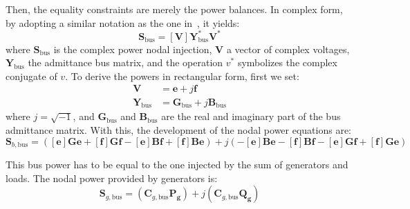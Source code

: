 \documentclass{article}
\begin{document}
Then, the equality constraints are merely the power balances. In complex form, by adopting a similar notation as the one in~\cite{zimmerman2016matpower}, it yields: 
\begin{equation}
    \bm{S}_\text{bus} = [\bm{V}]\bm{Y}^*_\text{bus}\bm{V}^*
    \label{eq:sbus}
\end{equation}
where $\bm{S}_\text{bus}$ is the complex power nodal injection, $\bm{V}$ a vector of complex voltages, $\bm{Y}_\text{bus}$ the admittance bus matrix, and the operation $v^*$ symbolizes the complex conjugate of $v$. To derive the powers in rectangular form, first we set:
\begin{align}
    \bm{V} &= \bm{e} + j\bm{f} \\
    \bm{Y}_\text{bus} &= \bm{G}_\text{bus} + j\bm{B}_\text{bus}
\end{align}
where $j=\sqrt{-1}$, and $\bm{G}_\text{bus}$ and $\bm{B}_\text{bus}$ are the real and imaginary part of the bus admittance matrix. With this, the development of the nodal power equations are:
\begin{equation}
    \bm{S}_{b,\text{bus}} = ([\bm{e}]\bm{G}\bm{e} + [\bm{f}]\bm{G}\bm{f} - [\bm{e}]\bm{B}\bm{f} + [\bm{f}]\bm{B}\bm{e}) + j(-[\bm{e}]\bm{B}\bm{e} - [\bm{f}]\bm{B}\bm{f} - [\bm{e}]\bm{G}\bm{f} + [\bm{f}]\bm{G}\bm{e})
\end{equation}

This bus power has to be equal to the one injected by the sum of generators and loads. The nodal power provided by generators is:
\begin{equation}
    \bm{S}_{g,\text{bus}} = (\bm{C}_{g,\text{bus}} \bm{P_g}) + j(\bm{C}_{g,\text{bus}} \bm{Q_g})
\end{equation}
\end{document}

